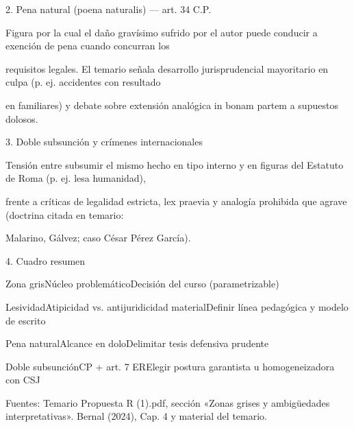 \documentclass[11pt,a4paper]{article}
\begin{document}
      2. Pena natural (poena naturalis) — art. 34 C.P.\par


        Figura por la cual el daño gravísimo sufrido por el autor puede conducir a exención de pena cuando concurran los\par
        requisitos legales. El temario señala desarrollo jurisprudencial mayoritario en culpa (p. ej. accidentes con resultado\par
        en familiares) y debate sobre extensión analógica in bonam partem a supuestos dolosos.\par





      3. Doble subsunción y crímenes internacionales\par


        Tensión entre subsumir el mismo hecho en tipo interno y en figuras del Estatuto de Roma (p. ej. lesa humanidad),\par
        frente a críticas de legalidad estricta, lex praevia y analogía prohibida que agrave (doctrina citada en temario:\par
        Malarino, Gálvez; caso César Pérez García).\par





      4. Cuadro resumen\par



          Zona grisNúcleo problemáticoDecisión del curso (parametrizable)\par




          LesividadAtipicidad vs. antijuridicidad materialDefinir línea pedagógica y modelo de escrito\par

          Pena naturalAlcance en doloDelimitar tesis defensiva prudente\par

          Doble subsunciónCP + art. 7 ERElegir postura garantista u homogeneizadora con CSJ\par








      Fuentes: Temario Propuesta R (1).pdf, sección «Zonas grises y ambigüedades interpretativas». Bernal (2024), Cap. 4 y material del temario.\par
\end{document}
